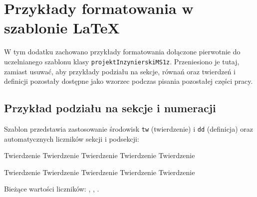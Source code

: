 \appendix
\label{chap:appendices}

\section{Przykłady formatowania w szablonie LaTeX}
\label{app:template-reference}

W tym dodatku zachowano przykłady formatowania dołączone pierwotnie do
uczelnianego szablonu klasy \texttt{projektInzynierskiMS1z}. Przeniesiono je tutaj,
zamiast usuwać, aby przykłady podziału na sekcje, równań oraz twierdzeń i definicji
pozostały dostępne jako wzorzec podczas pisania pozostałej części pracy.

\subsection{Przykład podziału na sekcje i numeracji}
\label{app:template-sectioning}

Szablon przedstawia zastosowanie środowisk \texttt{tw} (twierdzenie)
i \texttt{dd} (definicja) oraz automatycznych liczników sekcji i podsekcji:

\begin{twa}
Twierdzenie Twierdzenie Twierdzenie Twierdzenie Twierdzenie
\end{twa}
\begin{dd}
Twierdzenie Twierdzenie Twierdzenie Twierdzenie Twierdzenie
\end{dd}

Bieżące wartości liczników: \thesection, \thesubsection, \thesubsubsection.

